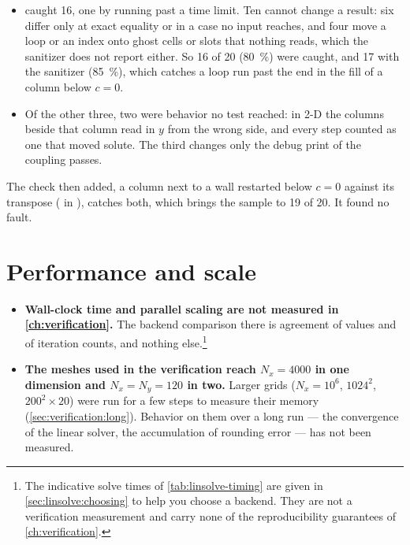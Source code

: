 \begin{itemize}
  \item {} caught 16, one by running past a time limit. Ten cannot
    change a result: six differ only at exact equality or in a case no input
    reaches, and four move a loop or an index onto ghost cells or slots that
    nothing reads, which the sanitizer does not report either. So 16 of 20
    (\SI{80}{\percent}) were caught, and 17 with the sanitizer
    (\SI{85}{\percent}), which catches a loop run past the end in the fill
    of a  column below $c = 0$.
  \item Of the other three, two were behavior no test reached: in 2-D the
    columns beside that column read in $y$ from the wrong side, and every
    step counted as one that moved solute. The third changes only the debug
    print of the coupling passes.
\end{itemize}

The check then added, a  column next to a wall restarted below
$c = 0$ against its transpose ( in
), catches both, which brings the sample to 19 of 20. It
found no fault.

\section{Performance and scale}
\label{sec:notverified:scale}

\begin{itemize}
  \item \textbf{Wall-clock time and parallel scaling are not measured in
    \cref{ch:verification}.} The backend comparison there is agreement of
    values and of iteration counts, and nothing else.\footnote{The indicative
    solve times of \cref{tab:linsolve-timing} are given in
    \cref{sec:linsolve:choosing} to help you choose a backend. They are not a
    verification measurement and carry none of the reproducibility guarantees
    of \cref{ch:verification}.}
  \item \textbf{The meshes used in the verification reach $N_x = 4000$ in one
    dimension and $N_x = N_y = 120$ in two.} Larger grids ($N_x = 10^{6}$,
    $1024^{2}$, $200^{2} \times 20$) were run for a few steps to measure their
    memory (\cref{sec:verification:long}). Behavior on them over a long run ---
    the convergence of the linear solver, the accumulation of rounding error
    --- has not been measured.
\end{itemize}
